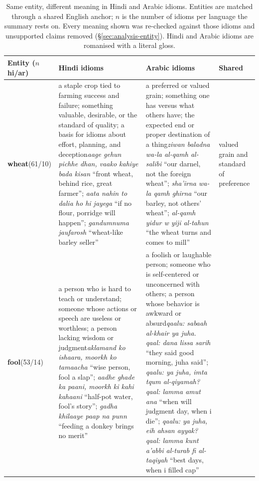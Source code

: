 \begin{table}[t]
\centering
\footnotesize
\setlength{\tabcolsep}{4pt}
\renewcommand{\arraystretch}{1.12}
\caption{Same entity, different meaning in \textcolor{encolor}{Hindi} and \textcolor{zhcolor}{Arabic} idioms. Entities are matched through a shared English anchor; $n$ is the number of idioms per language the summary rests on. Every meaning shown was re-checked against those idioms and unsupported claims removed (\S\ref{sec:analysis-entity}). Hindi and Arabic idioms are romanised with a literal gloss. }
\label{tab:entity-cases-hiar}
\begin{tabular}{@{}p{}p{}p{}p{}@{}}
\toprule
Entity ($n$ hi/ar) & \textcolor{encolor}{Hindi idioms} & \textcolor{zhcolor}{Arabic idioms} & Shared \\
\midrule
\textbf{wheat}\newline (61/10)
& \textcolor{encolor}{a staple crop tied to farming success and failure; something valuable, desirable, or the standard of quality; a basis for idioms about effort, planning, and deception}\newline \textit{aage gehun pichhe dhan, vaako kahiye bada kisan} ``front wheat, behind rice, great farmer''; \textit{aata nahin to dalia ho hi jayega} ``if no flour, porridge will happen''; \textit{gandumnuma jaufarosh} ``wheat-like barley seller''
& \textcolor{zhcolor}{a preferred or valued grain; something one has versus what others have; the expected end or proper destination of a thing}\newline \textit{ziwan baladna wa-la al-qamh al-salibi} ``our darnel, not the foreign wheat''; \textit{sha'irna wa-la qamh ghirna} ``our barley, not others' wheat''; \textit{al-qamh yidur w yiji al-tahun} ``the wheat turns and comes to mill''
& valued grain and standard of preference \\
\textbf{fool}\newline (53/14)
& \textcolor{encolor}{a person who is hard to teach or understand; someone whose actions or speech are useless or worthless; a person lacking wisdom or judgment}\newline \textit{aklamand ko ishaara, moorkh ko tamaacha} ``wise person, fool a slap''; \textit{aadhe ghade ka paani, moorkh ki kahi kahaani} ``half-pot water, fool's story''; \textit{gadha khilaaye paap na punn} ``feeding a donkey brings no merit''
& \textcolor{zhcolor}{a foolish or laughable person; someone who is self-centered or unconcerned with others; a person whose behavior is awkward or absurd}\newline \textit{qaalu: sabaah al-khair ya juha. qaal: dana lissa sarih} ``they said good morning, juha said''; \textit{qaalu: ya juha, imta tqum al-qiyamah? qaal: lamma amut ana} ``when will judgment day, when i die''; \textit{qaalu: ya juha, eih ahsan ayyak? qaal: lamma kunt a'abbi al-turab fi al-taqiyah} ``best days, when i filled cap''

\end{tabular}
\end{table}
